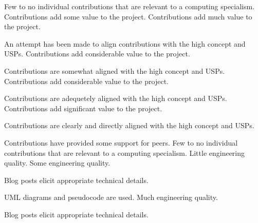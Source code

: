 \documentclass{../../fal_assignment}
\begin{document}
\begin{markingrubric}
%
        \grade\fail Few to no individual contributions that are relevant to a computing specialism.
        \grade Contributions add some value to the project.
        \grade Contributions add much value to the project.
            \par An attempt has been made to align contributions with the high concept and USPs.
        \grade Contributions add considerable value to the project.
            \par Contributions are somewhat aligned with the high concept and USPs.
        \grade Contributions add considerable value to the project.
            \par Contributions are adequetely aligned with the high concept and USPs.
        \grade Contributions add significant value to the project.
            \par Contributions are clearly and directly aligned with the high concept and USPs.
            \par Contributions have provided some support for peers.
%
        \grade\fail Few to no individual contributions that are relevant to a computing specialism.
        \grade Little engineering quality.
        \grade Some engineering quality.
            \par Blog posts elicit appropriate technical details.
            \par UML diagrams and pseudocode are used.
        \grade Much engineering quality.
            \par Blog posts elicit appropriate technical details.

\end{markingrubric}
\end{document}
